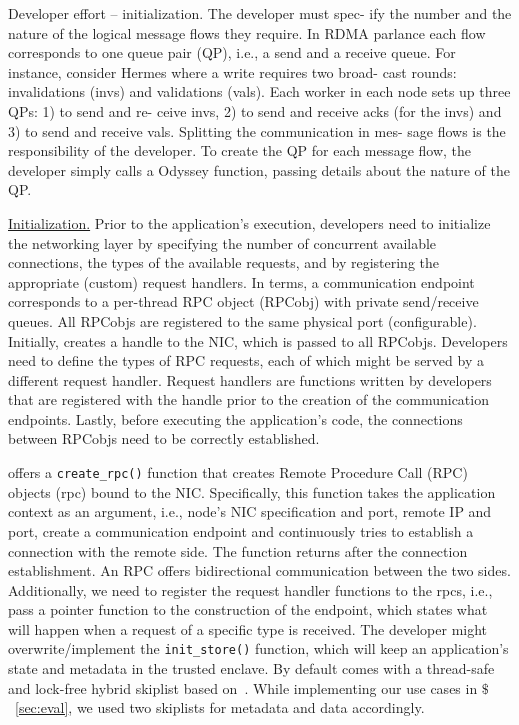 
Developer effort – initialization. The developer must spec-
ify the number and the nature of the logical message flows
they require. In RDMA parlance each flow corresponds to
one queue pair (QP), i.e., a send and a receive queue. For
instance, consider Hermes where a write requires two broad-
cast rounds: invalidations (invs) and validations (vals). Each
worker in each node sets up three QPs: 1) to send and re-
ceive invs, 2) to send and receive acks (for the invs) and 3) to
send and receive vals. Splitting the communication in mes-
sage flows is the responsibility of the developer. To create
the QP for each message flow, the developer simply calls a
Odyssey function, passing details about the nature of the QP.

\fi





\noindent\underline{Initialization.} Prior to the application's execution, developers need to initialize the networking layer by specifying the number of concurrent available connections, the types of the available requests, and by registering the appropriate (custom) request handlers. In \projecttitle{} terms, a communication endpoint corresponds to a per-thread RPC object (RPCobj) with private send/receive queues. All RPCobjs are registered to the same physical port (configurable). Initially, \projecttitle{} creates a handle to the NIC, which is passed to all RPCobjs. Developers need to define the types of RPC requests, each of which might be served by a different request handler. Request handlers are functions written by developers that are registered with the handle prior to the creation of the communication endpoints. Lastly, before executing the application's code, the connections between RPCobjs need to be correctly established.

\projecttitle{} offers a \texttt{create\_rpc()} function that creates Remote Procedure Call (RPC) objects (rpc) bound to the NIC. Specifically, this function takes the application context as an argument, i.e., node's NIC specification and port, remote IP and port, create a communication endpoint and continuously tries to establish a connection with the remote side. The function returns after the connection establishment. An RPC offers bidirectional communication between the two sides. Additionally, we need to register the request handler functions to the rpcs, i.e., pass a pointer function to the construction of the endpoint, which states what will happen when a request of a specific type is received. The developer might overwrite/implement the \texttt{init\_store()} function, which will keep an application's state and metadata in the trusted enclave. By default \projecttitle{} comes with a thread-safe and lock-free hybrid skiplist based on~\cite{avocado, folly}. While implementing our use cases in $\$$~\ref{sec:eval}, we used two  \projecttitle{} skiplists for metadata and data accordingly.  %
\fi

